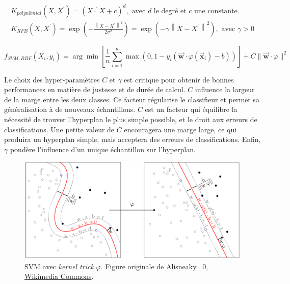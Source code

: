 \begin{equation} \label{eq:kernels}
\begin{split}
K_{polyn\hat{o}mial}\left(X, X^{\prime}\right) = \left(X \cdot ^{\prime} X + c\right)^{d}, \text{ avec } d \text{ le degré et } c \text{ une constante}.
\\
K_{RFB}\left(X, X^{\prime}\right) = \exp \left(-\frac{\left\|X-X^{\prime}\right\|^{2}}{2 \sigma^{2}}\right) = \exp \left(-\gamma\left\|X-X^{\prime}\right\|^{2}\right), \text{ avec } \gamma > 0
\end{split}
\end{equation}

\begin{equation} \label{eq:svm_trick}
f_{SVM,RBF}(X_i, y_i) = \arg \min \left[\frac{1}{n} \sum_{i=1}^{n} \max \left(0, 1-y_{i}\left(\vec{\mathbf{w}} \cdot \varphi(\vec{\mathbf{x}}_{i})-b\right)\right)\right]+ C \|\vec{\mathbf{w}} \cdot \varphi \|^{2}
\end{equation}

Le choix des hyper-paramètres $C$ et $\gamma$ est critique pour obtenir de bonnes performances en matière de justesse et de durée de calcul.
$C$ influence la largeur de la marge entre les deux classes.
Ce facteur régularise le classifieur et permet sa généralisation à de nouveaux échantillons.
$C$ est un facteur qui équilibre la nécessité de trouver l'hyperplan le plus simple possible, et le droit aux erreurs de classifications.
Une petite valeur de $C$ encouragera une marge large, ce qui produira un hyperplan simple, mais acceptera des erreurs de classifications.
Enfin, $\gamma$ pondère l'influence d'un unique échantillon sur l'hyperplan.

\begin{figure}[hbtp]
    \centering
    \includegraphics[width=\textwidth,height=\textheight,keepaspectratio]{../Chap3/Figures/Kernel_Machine_Pierre.pdf}
    \caption{SVM avec \emph{kernel trick} $\varphi$. Figure originale de \href{https://commons.wikimedia.org/wiki/File:Kernel_Machine.png}{Alisneaky \ccLogo \ \textnormal{0}, Wikimedia Commons}.}
    \label{fig:svm}
\end{figure}

